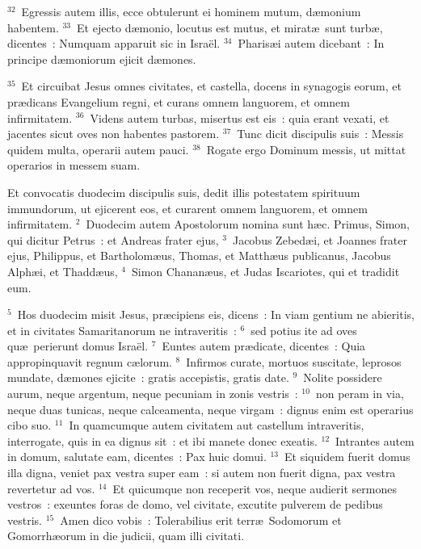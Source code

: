 ${}^{32}$~Egressis autem illis, ecce obtulerunt ei hominem mutum, d\ae monium habentem.
${}^{33}$~Et ejecto d\ae monio, locutus est mutus, et mirat\ae\ sunt turb\ae , dicentes~: Numquam apparuit sic in Isra\"el.
${}^{34}$~Pharis\ae i autem dicebant~: In principe d\ae moniorum ejicit d\ae mones.


${}^{35}$~Et circuibat Jesus omnes civitates, et castella, docens in synagogis eorum, et pr\ae dicans Evangelium regni, et curans omnem languorem, et omnem infirmitatem.
${}^{36}$~Videns autem turbas, misertus est eis~: quia erant vexati, et jacentes sicut oves non habentes pastorem.
${}^{37}$~Tunc dicit discipulis suis~: Messis quidem multa, operarii autem pauci.
${}^{38}$~Rogate ergo Dominum messis, ut mittat operarios in messem suam.

\lettrine[lines=10,image=true,loversize=0.05,lraise=-0.03]{E}{}t convocatis duodecim discipulis suis, dedit illis potestatem spirituum immundorum, ut ejicerent eos, et curarent omnem languorem, et omnem infirmitatem.
${}^{2}$~Duodecim autem Apostolorum nomina sunt h\ae c. Primus, Simon, qui dicitur Petrus~: et Andreas frater ejus,
${}^{3}$~Jacobus Zebed\ae i, et Joannes frater ejus, Philippus, et Bartholom\ae us, Thomas, et Matth\ae us publicanus, Jacobus Alph\ae i, et Thadd\ae us,
${}^{4}$~Simon Chanan\ae us, et Judas Iscariotes, qui et tradidit eum.


${}^{5}$~Hos duodecim misit Jesus, pr\ae cipiens eis, dicens~: In viam gentium ne abieritis, et in civitates Samaritanorum ne intraveritis~:
${}^{6}$~sed potius ite ad oves qu\ae\ perierunt domus Isra\"el.
${}^{7}$~Euntes autem pr\ae dicate, dicentes~: Quia appropinquavit regnum c\ae lorum.
${}^{8}$~Infirmos curate, mortuos suscitate, leprosos mundate, d\ae mones ejicite~: gratis accepistis, gratis date.
${}^{9}$~Nolite possidere aurum, neque argentum, neque pecuniam in zonis vestris~:
${}^{10}$~non peram in via, neque duas tunicas, neque calceamenta, neque virgam~: dignus enim est operarius cibo suo.
${}^{11}$~In quamcumque autem civitatem aut castellum intraveritis, interrogate, quis in ea dignus sit~: et ibi manete donec exeatis.
${}^{12}$~Intrantes autem in domum, salutate eam, dicentes~: Pax huic domui.
${}^{13}$~Et siquidem fuerit domus illa digna, veniet pax vestra super eam~: si autem non fuerit digna, pax vestra revertetur ad vos.
${}^{14}$~Et quicumque non receperit vos, neque audierit sermones vestros~: exeuntes foras de domo, vel civitate, excutite pulverem de pedibus vestris.
${}^{15}$~Amen dico vobis~: Tolerabilius erit terr\ae\ Sodomorum et Gomorrh\ae orum in die judicii, quam illi civitati.


